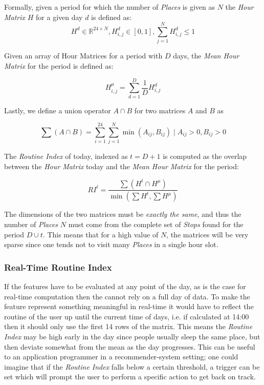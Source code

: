 Formally, given a period for which the number of \textit{Places} is given as $N$ the \textit{Hour Matrix} $H$ for a given day $d$ is defined as:
$$H^d \in \mathbb{R}^{24 \times N}, H^d_{i,j} \in [0,1], \sum_{j=1}^N H^d_{i,j} \leq 1$$

Given an array of Hour Matrices for a period with $D$ days, the \textit{Mean Hour Matrix} for the period is defined as:

$$H^{\mu}_{i,j} = \sum_{d=1}^D \frac{1}{D} H^d_{i,j}$$

Lastly, we define a union operator $A \cap B$ for two matrices $A$ and $B$ as 

$$\sum (A \cap B) = \sum_{i=1}^{24} \sum_{j=1}^{N} \min (A_{ij}, B_{ij}) \;|\; A_{ij} > 0, B_{ij} > 0$$

The \textit{Routine Index} of today, indexed as $t=D+1$ is computed as the overlap between the \textit{Hour Matrix} today and the \textit{Mean Hour Matrix} for the period:

$$RI^{t} = \frac{\sum (H^t \cap H^{\mu})}{\min (\sum H^t, \sum H^{\mu})}$$

The dimensions of the two matrices must be \textit{exactly the same}, and thus the number of \textit{Places} $N$ must come from the complete set of \textit{Stops} found for the period $D \cup t$. This means that for a high value of $N$, the matrices will be very sparse since one tends not to visit many \textit{Places} in a single hour slot.

\subsubsection*{Real-Time Routine Index}
If the features have to be evaluated at any point of the day, as is the case for real-time computation then the  cannot rely on a full day of data. To make the feature represent something meaningful in real-time it would have to reflect the routine of the user up until the current time of days, i.e. if calculated at 14:00 then it should only use the first 14 rows of the matrix. This means the \textit{Routine Index} may be high early in the day since people usually sleep the same place, but then deviate somewhat from the mean as the day progresses. This can be useful to an application programmer in a recommender-system setting; one could imagine that if the \textit{Routine Index} falls below a certain threshold, a trigger can be set which will prompt the user to perform a specific action to get back on track.

